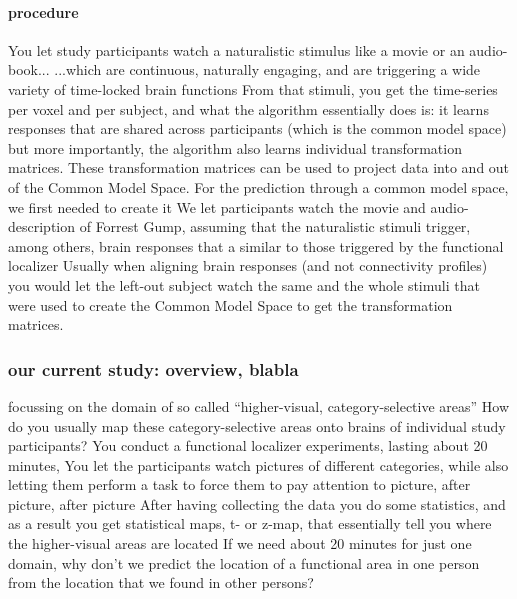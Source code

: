 \paragraph{procedure}
%
You let study participants watch a naturalistic stimulus like a movie or an
audio-book...  ...which are continuous, naturally engaging, and are triggering a
wide variety of time-locked brain functions
%
From that stimuli, you get the time-series per voxel and per subject, and what
the algorithm essentially does is: it learns responses that are shared across
participants (which is the common model space)
%
but more importantly, the algorithm also learns individual transformation
matrices.
%
These transformation matrices can be used to project data into and out of the
Common Model Space.
For the prediction through a common model space, we first needed to create it
%
We let participants watch the movie and audio-description of Forrest Gump,
assuming that the naturalistic stimuli trigger, among others, brain responses
that a similar to those triggered by the functional localizer
%
Usually when aligning brain responses (and not connectivity profiles) you would
let the left-out subject watch the same and the whole stimuli that were used to
create the Common Model Space to get the transformation matrices.



\subsubsection{our current study: overview, blabla}
%
focussing on the domain of so called ``higher-visual, category-selective
areas''
%
How do you usually map these category-selective areas onto brains of individual
study participants?
%
You conduct a functional localizer experiments, lasting about 20 minutes,
%
You let the participants watch pictures of different categories, while also
letting them perform a task to force them to pay attention to picture, after
picture, after picture
%
After having collecting the data you do some statistics, and as a result you
get statistical maps, t- or z-map, that essentially tell you where the
higher-visual areas are located
%
If we need about 20 minutes for just one domain, why don’t we predict the
location of a functional area in one person from the location that we found in
other persons?


